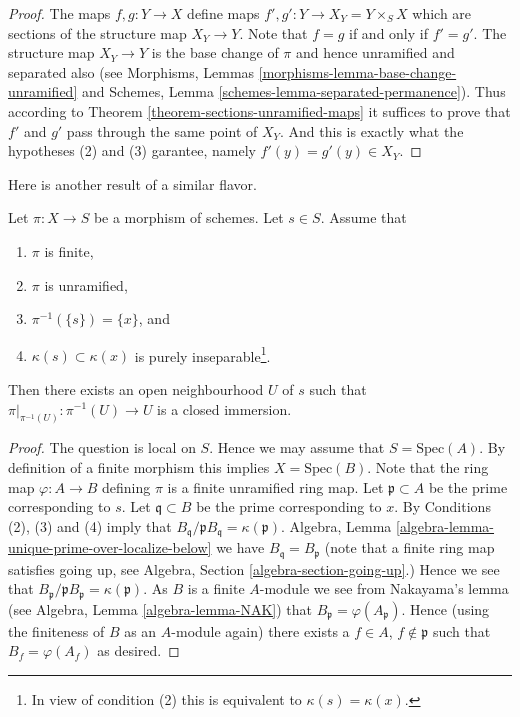 \begin{proof}
The maps $f, g : Y \to X$ define maps $f', g' : Y \to X_Y = Y \times_S X$
which are sections of the structure map $X_Y \to Y$.
Note that $f = g$ if and only if $f' = g'$.
The structure map $X_Y \to Y$ is the base change of $\pi$ and hence
unramified and separated also (see
Morphisms, Lemmas \ref{morphisms-lemma-base-change-unramified} and
Schemes, Lemma \ref{schemes-lemma-separated-permanence}).
Thus according to Theorem \ref{theorem-sections-unramified-maps}
it suffices to prove that $f'$ and $g'$ pass through the same
point of $X_Y$. And this is exactly what the hypotheses (2) and (3)
garantee, namely $f'(y) = g'(y) \in X_Y$.
\end{proof}

\noindent
Here is another result of a similar flavor.

\begin{lemma}
\label{lemma-finite-unramified-one-point}
Let $\pi : X \to S$ be a morphism of schemes. Let $s \in S$.
Assume that
\begin{enumerate}
\item $\pi$ is finite,
\item $\pi$ is unramified,
\item $\pi^{-1}(\{s\}) = \{x\}$, and
\item $\kappa(s) \subset \kappa(x)$ is purely
inseparable\footnote{In view of condition (2)
this is equivalent to $\kappa(s) = \kappa(x)$.}.
\end{enumerate}
Then there exists an open neighbourhood $U$ of $s$ such that
$\pi|_{\pi^{-1}(U)} : \pi^{-1}(U) \to U$ is a closed immersion.
\end{lemma}

\begin{proof}
The question is local on $S$. Hence we may assume that $S = \text{Spec}(A)$.
By definition of a finite morphism this implies $X = \text{Spec}(B)$.
Note that the ring map $\varphi : A \to B$ defining $\pi$
is a finite unramified ring map.
Let $\mathfrak p \subset A$ be the prime corresponding to $s$.
Let $\mathfrak q \subset B$ be the prime corresponding to $x$. By
Conditions (2), (3) and (4) imply that
$B_{\mathfrak q}/\mathfrak pB_{\mathfrak q} = \kappa(\mathfrak p)$.
Algebra, Lemma \ref{algebra-lemma-unique-prime-over-localize-below}
we have $B_{\mathfrak q} = B_{\mathfrak p}$
(note that a finite ring map satisfies going up, see
Algebra, Section \ref{algebra-section-going-up}.)
Hence we see that
$B_{\mathfrak p}/\mathfrak pB_{\mathfrak p} = \kappa(\mathfrak p)$.
As $B$ is a finite $A$-module we see from Nakayama's lemma (see
Algebra, Lemma \ref{algebra-lemma-NAK})
that $B_{\mathfrak p} = \varphi(A_{\mathfrak p})$. Hence (using the finiteness
of $B$ as an $A$-module again) there exists a
$f \in A$, $f \not \in \mathfrak p$ such that $B_f = \varphi(A_f)$
as desired.
\end{proof}

